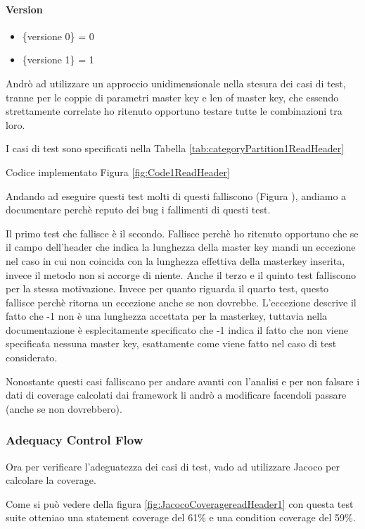 \documentclass[12pt, a4paper]{article}
\begin{document}
\paragraph{Version}
\begin{itemize}
  \item \{versione 0\} = 0
  \item \{versione 1\} = 1
\end{itemize}

Andrò ad utilizzare un approccio unidimensionale nella stesura dei casi 
di test, tranne per le coppie di parametri master key e len of master key,
che essendo strettamente correlate ho ritenuto opportuno testare tutte le 
combinazioni tra loro.

I casi di test sono specificati nella Tabella \ref{tab:categoryPartition1ReadHeader}

Codice implementato Figura \ref{fig:Code1ReadHeader}


Andando ad eseguire questi test molti di questi falliscono (Figura ), andiamo a documentare perchè reputo 
dei bug i fallimenti di questi test.

Il primo test che fallisce è il secondo. Fallisce perchè ho ritenuto opportuno che se il campo dell'header 
che indica la lunghezza della master key mandi un eccezione nel caso in cui non coincida con la lunghezza effettiva 
della masterkey inserita, invece il metodo non si accorge di niente.
Anche il terzo e il quinto test falliscono per la stessa motivazione. 
Invece per quanto riguarda il quarto test, questo fallisce perchè ritorna un eccezione anche se non dovrebbe. 
L'eccezione descrive il fatto che -1 non è una lunghezza accettata per la masterkey, tuttavia nella documentazione è
esplecitamente specificato che -1 indica il fatto che non viene specificata nessuna master key, esattamente come viene 
fatto nel caso di test considerato.

Nonostante questi casi falliscano per andare avanti con l'analisi e per non falsare i dati di coverage calcolati
dai framework li andrò a modificare facendoli passare (anche se non dovrebbero).


\subsubsection{Adequacy Control Flow}
Ora per verificare l'adeguatezza dei casi di test, vado ad utilizzare
Jacoco per calcolare la coverage.

Come si può vedere della figura \ref{fig:JacocoCoveragereadHeader1} con questa test suite otteniao
una statement coverage del 61\% e una condition coverage del 59\%.
\end{document}
